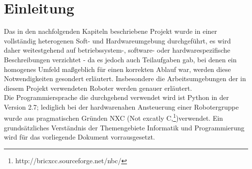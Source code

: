 \chapter{Einleitung}

Das in den nachfolgenden Kapiteln beschriebene Projekt wurde in einer vollständig heterogenen Soft- und Hardwareumgebung durchgeführt, 
es wird daher weitestgehend auf betriebssystem-, software- oder hardwarespezifische Beschreibungen verzichtet - da es jedoch auch Teilaufgaben gab, 
bei denen ein homogenes Umfeld maßgeblich für einen korrekten Ablauf war, werden diese Notwendigkeiten gesondert erläutert. Insbesondere die Arbeitsumgebungen 
der in diesem Projekt verwendeten Roboter werden genauer erläutert.\\
Die Programmiersprache die durchgehend verwendet wird ist Python in der Version 2.7; lediglich bei der hardwarenahen Ansteuerung einer Robotergruppe wurde aus 
pragmatischen Gründen NXC (Not excatly C,\footnote{http://bricxcc.sourceforge.net/nbc/})verwendet.
Ein grundsätzliches Verständnis der Themengebiete Informatik und Programmierung wird für das vorliegende Dokument vorrausgesetzt.
